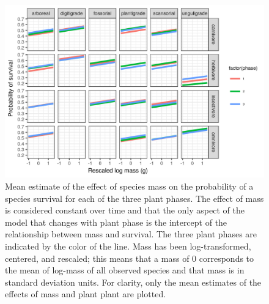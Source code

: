 \documentclass[12pt,letterpaper]{article}
\begin{document}
\begin{figure}[ht]
  \centering
  \includegraphics[width=\textwidth,height=0.4\textheight,keepaspectratio=true]{figure/mass_on_surv_bd}
  \caption[Effect of mass on probability of species survival as estimated from the birth-death model]{Mean estimate of the effect of species mass on the probability of a species survival for each of the three plant phases. The effect of mass is considered constant over time and that the only aspect of the model that changes with plant phase is the intercept of the relationship between mass and survival. The three plant phases are indicated by the color of the line. Mass has been log-transformed, centered, and rescaled; this means that a mass of 0 corresponds to the mean of log-mass of all observed species and that mass is in standard deviation units. For clarity, only the mean estimates of the effects of mass and plant plant are plotted.}
  \label{fig:mass_survival}
\end{figure}
\end{document}
